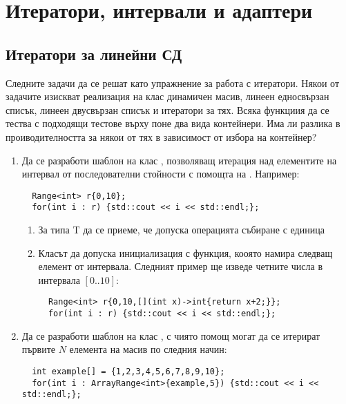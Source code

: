 \section {Итератори, интервали и адаптери}
\subsection {Итератори за линейни СД}
\label{iterators1}
Следните задачи да се решат като упражнение за работа с итератори. Някои от задачите изискват реализация на клас динамичен масив, линеен едносвързан списък, линеен двусвързан списък и  итератори за тях. Всяка функциия да се тества с подходящи тестове върху поне два вида контейнери. Има ли разлика в проиводителността за някои от тях в зависимост от избора на контейнер?


\begin{enumerate}

  \item Да се разработи шаблон на клас , позволяващ итерация над елементите на интервал от последователни стойности с помощта на . Например:
\begin{verbatim}
  Range<int> r{0,10};
  for(int i : r) {std::cout << i << std::endl;};
\end{verbatim}  

  \begin{enumerate}[label=\alph*)]
    \item За типа T да се приеме, че допуска операцията събиране с единица 
    \item Класът да допуска инициализация с функция, кооято намира следващ елемент от интервала. Следният пример ще изведе четните числа в интервала $[0..10]$:
\begin{verbatim}
  Range<int> r{0,10,[](int x)->int{return x+2;}};
  for(int i : r) {std::cout << i << std::endl;};
\end{verbatim}  
  \end{enumerate}
  
  \item Да се разработи шаблон на клас , с чиято помощ могат да се итерират първите $N$ елемента на масив  по следния начин:
\begin{verbatim}
  int example[] = {1,2,3,4,5,6,7,8,9,10};
  for(int i : ArrayRange<int>{example,5}) {std::cout << i << std::endl;};
\end{verbatim}  
  

\end{enumerate}
